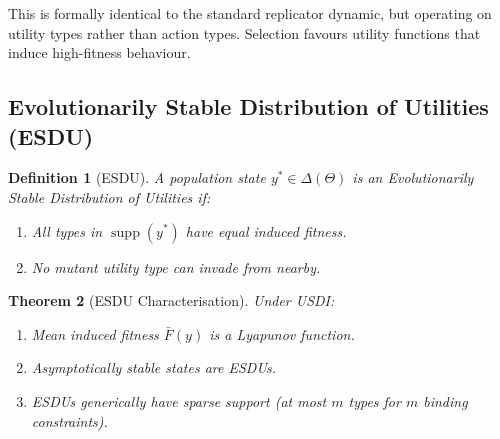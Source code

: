 \documentclass[12pt]{article}
\newtheorem{theorem}{Theorem}[section]
\newtheorem{definition}[theorem]{Definition}
\DeclareMathOperator{\supp}{supp}
\begin{document}
This is formally identical to the standard replicator dynamic, but operating on utility types rather than action types. Selection favours utility functions that induce high-fitness behaviour.

\subsection{Evolutionarily Stable Distribution of Utilities (ESDU)}

\begin{definition}[ESDU]
A population state $y^* \in \Delta(\Theta)$ is an \emph{Evolutionarily Stable Distribution of Utilities} if:
\begin{enumerate}
    \item All types in $\supp(y^*)$ have equal induced fitness.
    \item No mutant utility type can invade from nearby.
\end{enumerate}
\end{definition}

\begin{theorem}[ESDU Characterisation]
\label{thm:esdu}
Under USDI:
\begin{enumerate}
    \item[(a)] Mean induced fitness $\bar{F}(y)$ is a Lyapunov function.
    \item[(b)] Asymptotically stable states are ESDUs.
    \item[(c)] ESDUs generically have sparse support (at most $m$ types for $m$ binding constraints).
\end{enumerate}
\end{theorem}
\end{document}
